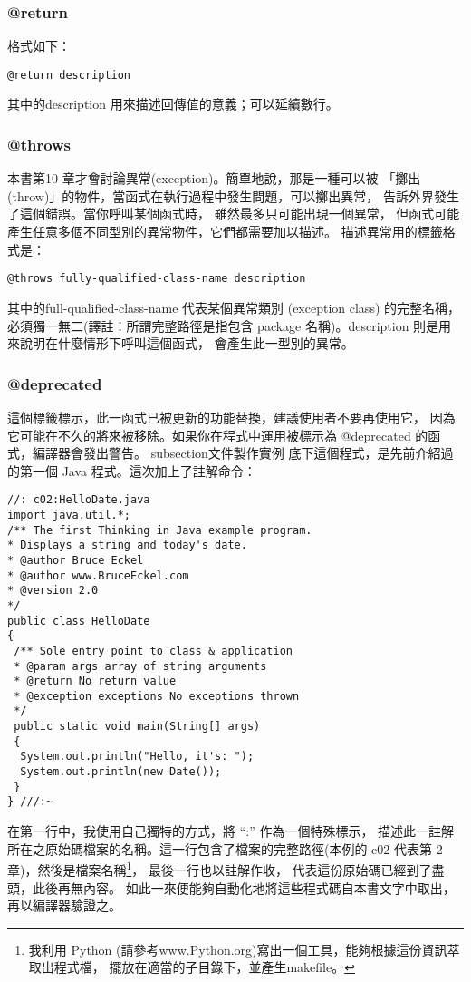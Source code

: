 \subsubsection{@return}
格式如下：
\begin{Verbatim}[frame=single]
@return description
\end{Verbatim}
其中的description 用來描述回傳值的意義；可以延續數行。
\subsubsection{@throws}
本書第10 章才會討論異常(exception)。簡單地說，那是一種可以被
「擲出(throw)」的物件，當函式在執行過程中發生問題，可以擲出異常，
告訴外界發生了這個錯誤。當你呼叫某個函式時，
雖然最多只可能出現一個異常，
但函式可能產生任意多個不同型別的異常物件，它們都需要加以描述。
描述異常用的標籤格式是：
\begin{Verbatim}[frame=single]
@throws fully-qualified-class-name description
\end{Verbatim}
其中的full-qualified-class-name 代表某個異常類別 (exception class)
的完整名稱，必須獨一無二(譯註：所謂完整路徑是指包含
package 名稱)。description 則是用來說明在什麼情形下呼叫這個函式，
會產生此一型別的異常。
\subsubsection{@deprecated}
這個標籤標示，此一函式已被更新的功能替換，建議使用者不要再使用它，
因為它可能在不久的將來被移除。如果你在程式中運用被標示為
@deprecated 的函式，編譯器會發出警告。
subsection{文件製作實例}
底下這個程式，是先前介紹過的第一個 Java 程式。這次加上了註解命令：
\begin{Verbatim}[frame=single]
//: c02:HelloDate.java
import java.util.*;
/** The first Thinking in Java example program.
* Displays a string and today's date.
* @author Bruce Eckel
* @author www.BruceEckel.com
* @version 2.0
*/
public class HelloDate 
{
 /** Sole entry point to class & application
 * @param args array of string arguments
 * @return No return value
 * @exception exceptions No exceptions thrown
 */
 public static void main(String[] args) 
 {
  System.out.println("Hello, it's: ");
  System.out.println(new Date());
 }
} ///:~
\end{Verbatim}

在第一行中，我使用自己獨特的方式，將 ``:'' 作為一個特殊標示，
描述此一註解所在之原始碼檔案的名稱。這一行包含了檔案的完整路徑(本例的
c02 代表第 2 章)，然後是檔案名稱\footnote{我利用 Python
(請參考www.Python.org)寫出一個工具，能夠根據這份資訊萃取出程式檔，
擺放在適當的子目錄下，並產生makefile。}， 最後一行也以註解作收，
代表這份原始碼已經到了盡頭，此後再無內容。
如此一來便能夠自動化地將這些程式碼自本書文字中取出，再以編譯器驗證之。
